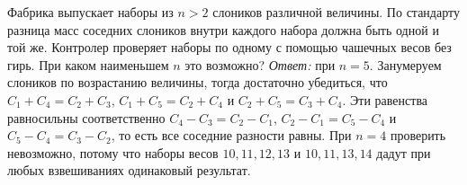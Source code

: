 \problem
Фабрика выпускает наборы из $n > 2$ слоников различной величины.
По стандарту разница масс соседних слоников внутри каждого набора должна быть
одной и той же.
Контролер проверяет наборы по одному с помощью чашечных весов без гирь.
При каком наименьшем $n$ это возможно?
\solution
\emph{Ответ:} при $n = 5$.
Занумеруем слоников по возрастанию величины, тогда достаточно убедиться, что
$C_1 + C_4 = C_2 + C_3$, $C_1 + C_5 = C_2 + C_4$ и $C_2 + C_5 = C_3 + C_4$.
Эти равенства равносильны соответственно $C_4 - C_3 = C_2 - C_1$,
$C_2 - C_1 = C_5 - C_4$ и $C_5 - C_4 = C_3 - C_2$, то есть все соседние
разности равны.
При $n = 4$ проверить невозможно, потому что наборы весов $10, 11, 12, 13$ и
$10, 11, 13, 14$ дадут при любых взвешиваниях одинаковый результат.
\endproblem
